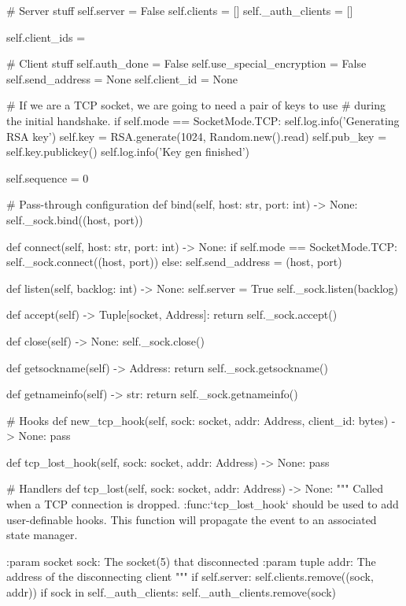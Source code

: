 \begin{pythoncode}
        # Server stuff
        self.server = False
        self.clients = []
        self._auth_clients = []

        self.client_ids = {}

        # Client stuff
        self.auth_done = False
        self.use_special_encryption = False
        self.send_address = None
        self.client_id = None

        # If we are a TCP socket, we are going to need a pair of keys to use
        # during the initial handshake.
        if self.mode == SocketMode.TCP:
            self.log.info('Generating RSA key')
            self.key = RSA.generate(1024, Random.new().read)
            self.pub_key = self.key.publickey()
            self.log.info('Key gen finished')

        self.sequence = 0

    # Pass-through configuration
    def bind(self, host: str, port: int) -> None:
        self._sock.bind((host, port))

    def connect(self, host: str, port: int) -> None:
        if self.mode == SocketMode.TCP:
            self._sock.connect((host, port))
        else:
            self.send_address = (host, port)

    def listen(self, backlog: int) -> None:
        self.server = True
        self._sock.listen(backlog)

    def accept(self) -> Tuple[socket, Address]:
        return self._sock.accept()

    def close(self) -> None:
        self._sock.close()

    def getsockname(self) -> Address:
        return self._sock.getsockname()

    def getnameinfo(self) -> str:
        return self._sock.getnameinfo()

    # Hooks
    def new_tcp_hook(self, sock: socket, addr: Address, client_id: bytes) -> None:
        pass

    def tcp_lost_hook(self, sock: socket, addr: Address) -> None:
        pass

    # Handlers
    def tcp_lost(self, sock: socket, addr: Address) -> None:
        """
        Called when a TCP connection is dropped. :func:`tcp_lost_hook` should
        be used to add user-definable hooks.
        This function will propagate the event to an associated state manager.

        :param socket sock: The socket(5) that disconnected
        :param tuple addr: The address of the disconnecting client
        """
        if self.server:
            self.clients.remove((sock, addr))
            if sock in self._auth_clients:
                self._auth_clients.remove(sock)


\end{pythoncode}

